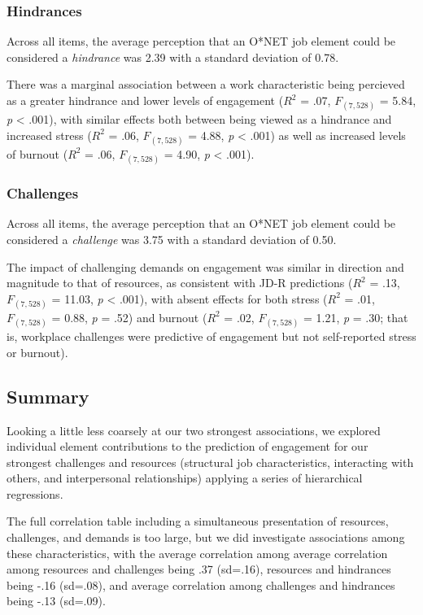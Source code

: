 \documentclass[
  english,
  man]{apa6}
\begin{document}
\hypertarget{hindrances}{%
\subsubsection{Hindrances}\label{hindrances}}

Across all items, the average perception that an O*NET job element could be considered a \emph{hindrance} was 2.39 with a standard deviation of 0.78.

There was a marginal association between a work characteristic being percieved as a greater hindrance and lower levels of engagement (\(R^2\) = .07, \(F_(7,528)\) = 5.84, \emph{p} \textless{} .001), with similar effects both between being viewed as a hindrance and increased stress (\(R^2\) = .06, \(F_(7,528)\) = 4.88, \emph{p} \textless{} .001) as well as increased levels of burnout (\(R^2\) = .06, \(F_(7,528)\) = 4.90, \emph{p} \textless{} .001).

\hypertarget{challenges}{%
\subsubsection{Challenges}\label{challenges}}

Across all items, the average perception that an O*NET job element could be considered a \emph{challenge} was 3.75 with a standard deviation of 0.50.

The impact of challenging demands on engagement was similar in direction and magnitude to that of resources, as consistent with JD-R predictions (\(R^2\) = .13, \(F_(7,528)\) = 11.03, \emph{p} \textless{} .001), with absent effects for both stress (\(R^2\) = .01, \(F_(7,528)\) = 0.88, \emph{p} = .52) and burnout (\(R^2\) = .02, \(F_(7,528)\) = 1.21, \emph{p} = .30; that is, workplace challenges were predictive of engagement but not self-reported stress or burnout).

\hypertarget{summary}{%
\subsection{Summary}\label{summary}}

Looking a little less coarsely at our two strongest associations, we explored individual element contributions to the prediction of engagement for our strongest challenges and resources (structural job characteristics, interacting with others, and interpersonal relationships) applying a series of hierarchical regressions.

The full correlation table including a simultaneous presentation of resources, challenges, and demands is too large, but we did investigate associations among these characteristics, with the average correlation among average correlation among resources and challenges being .37 (sd=.16), resources and hindrances being -.16 (sd=.08), and average correlation among challenges and hindrances being -.13 (sd=.09).
\end{document}
